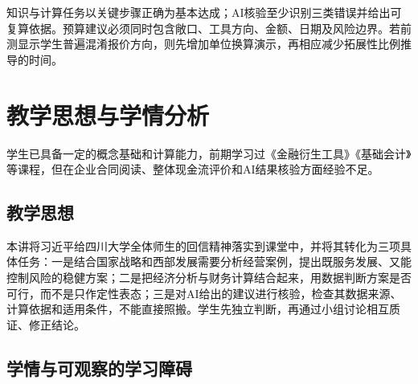 \documentclass[lang=cn,11pt,oneside,openany,chinesefont=nofont,color=blue,titlestyle=hang]{elegantbook}
\begin{document}
知识与计算任务以关键步骤正确为基本达成；AI核验至少识别三类错误并给出可复算依据。预算建议必须同时包含敞口、工具方向、金额、日期及风险边界。若前测显示学生普遍混淆报价方向，则先增加单位换算演示，再相应减少拓展性比例推导的时间。

\clearpage

\section{教学思想与学情分析}\label{sec:g4}

学生已具备一定的概念基础和计算能力，前期学习过《金融衍生工具》《基础会计》等课程，但在企业合同阅读、整体现金流评价和AI结果核验方面经验不足。

\subsection*{教学思想}

本讲将习近平给四川大学全体师生的回信精神落实到课堂中，并将其转化为三项具体任务：一是结合国家战略和西部发展需要分析经营案例，提出既服务发展、又能控制风险的稳健方案；二是把经济分析与财务计算结合起来，用数据判断方案是否可行，而不是只作定性表态；三是对AI给出的建议进行核验，检查其数据来源、计算依据和适用条件，不能直接照搬。学生先独立判断，再通过小组讨论相互质证、修正结论。

\subsection*{学情与可观察的学习障碍}
\end{document}
